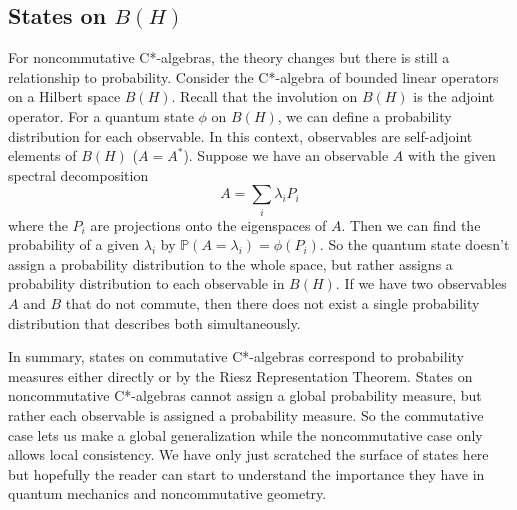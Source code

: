 \subsection{States on $B(H)$}
For noncommutative C*-algebras, the theory changes but there is still a relationship
to probability. Consider the C*-algebra of bounded linear operators on a Hilbert
space $B(H)$. Recall that  the involution on $B(H)$ is the adjoint operator. For a
quantum state $\phi$ on $B(H)$, we can define a probability distribution for each
observable. In this context, observables are self-adjoint elements of $B(H)$ ($A=A^*$).
Suppose we have an observable $A$ with the given spectral decomposition
\begin{equation*}
    A = \sum_i \lambda_i P_i
\end{equation*}
where the $P_i$ are projections onto the eigenspaces of $A$. Then we can find the 
probability of a given $\lambda_i$ by $\mathbb{P}(A=\lambda_i) = \phi(P_i)$. So the
quantum state doesn't assign a probability distribution to the whole space, but rather
assigns a probability distribution to each observable in $B(H)$. If we have two
observables $A$ and $B$ that do not commute, then there does not exist a single 
probability distribution that describes both simultaneously.

\par 

In summary, states on commutative C*-algebras correspond to probability measures
either directly or by the Riesz Representation Theorem. States on noncommutative
C*-algebras cannot assign a global probability measure, but rather each observable
is assigned a probability measure. So the commutative case lets us make a global
generalization while the noncommutative case only allows local consistency. We have
only just scratched the surface of states here but hopefully the reader can start
to understand the importance they have in quantum mechanics and noncommutative geometry.

